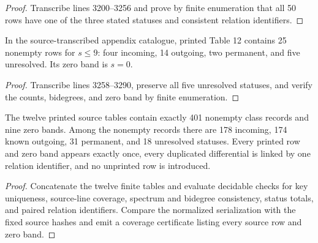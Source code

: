 \begin{proof}
  Transcribe lines 3200--3256 and prove by finite enumeration that all 50 rows
  have one of the three stated statuses and consistent relation identifiers.
\end{proof}

\begin{proposition}
  \label{data:table-s127-low}
  \notready
  In the source-transcribed appendix catalogue, printed Table 12 contains 25 nonempty rows
  for $s\le9$: four incoming, 14 outgoing, two permanent, and five unresolved.
  Its zero band is $s=0$.
\end{proposition}

\begin{proof}
  Transcribe lines 3258--3290, preserve all five unresolved statuses, and
  verify the counts, bidegrees, and zero band by finite enumeration.
\end{proof}

\begin{theorem}
  \label{thm:appendix-all-rows-encoded}
  \notready
  The twelve printed source tables contain exactly 401 nonempty class records and
  nine zero bands.  Among the nonempty records there are 178 incoming, 174 known
  outgoing, 31 permanent, and 18 unresolved statuses.  Every printed row and
  zero band appears exactly once, every duplicated differential is linked by
  one relation identifier, and no unprinted row is introduced.
\end{theorem}

\begin{proof}
  Concatenate the twelve finite tables and evaluate decidable checks for key
  uniqueness, source-line coverage, spectrum and bidegree consistency, status
  totals, and paired relation identifiers.  Compare the normalized
  serialization with the fixed source hashes and emit a coverage certificate
  listing every source row and zero band.
\end{proof}

